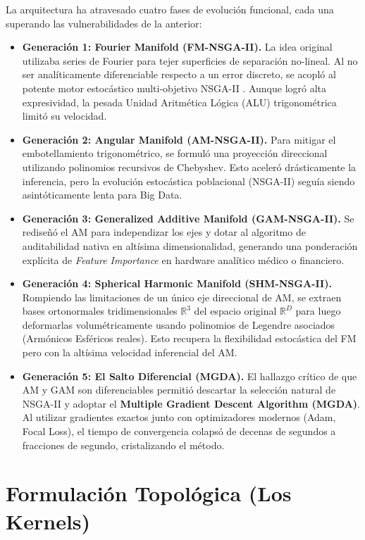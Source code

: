 \documentclass[10pt,twocolumn,letterpaper]{article}
\begin{document}
La arquitectura ha atravesado cuatro fases de evolución funcional, cada una superando las vulnerabilidades de la anterior:
\begin{itemize}
    \item \textbf{Generación 1: Fourier Manifold (FM-NSGA-II).} La idea original utilizaba series de Fourier para tejer superficies de separación no-lineal. Al no ser analíticamente diferenciable respecto a un error discreto, se acopló al potente motor estocástico multi-objetivo NSGA-II \cite{deb2002fast}. Aunque logró alta expresividad, la pesada Unidad Aritmética Lógica (ALU) trigonométrica limitó su velocidad.
    \item \textbf{Generación 2: Angular Manifold (AM-NSGA-II).} Para mitigar el embotellamiento trigonométrico, se formuló una proyección direccional utilizando polinomios recursivos de Chebyshev. Esto aceleró drásticamente la inferencia, pero la evolución estocástica poblacional (NSGA-II) seguía siendo asintóticamente lenta para Big Data.
    \item \textbf{Generación 3: Generalized Additive Manifold (GAM-NSGA-II).} Se rediseñó el AM para independizar los ejes y dotar al algoritmo de auditabilidad nativa en altísima dimensionalidad, generando una ponderación explícita de \textit{Feature Importance} en hardware analítico médico o financiero.
    \item \textbf{Generación 4: Spherical Harmonic Manifold (SHM-NSGA-II).} Rompiendo las limitaciones de un único eje direccional de AM, se extraen bases ortonormales tridimensionales $\mathbb{R}^3$ del espacio original $\mathbb{R}^D$ para luego deformarlas volumétricamente usando polinomios de Legendre asociados (Armónicos Esféricos reales). Esto recupera la flexibilidad estocástica del FM pero con la altísima velocidad inferencial del AM.
    \item \textbf{Generación 5: El Salto Diferencial (MGDA).} El hallazgo crítico de que AM y GAM son diferenciables permitió descartar la selección natural de NSGA-II y adoptar el \textbf{Multiple Gradient Descent Algorithm (MGDA)}. Al utilizar gradientes exactos junto con optimizadores modernos (Adam, Focal Loss), el tiempo de convergencia colapsó de decenas de segundos a fracciones de segundo, cristalizando el método.
\end{itemize}

\section{Formulación Topológica (Los Kernels)}
\end{document}
